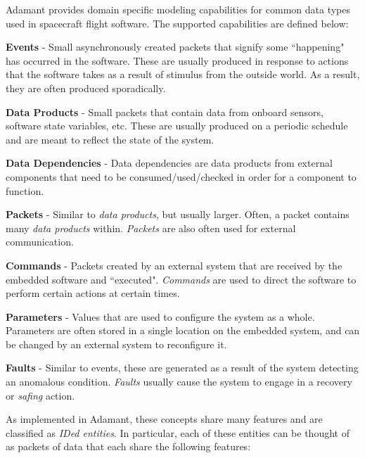 Adamant provides domain specific modeling capabilities for common data types used in spacecraft flight software. The supported capabilities are defined below:

\vspace{5mm} %
\begin{spaceditemize}
  \item \textbf{Events} - Small asynchronously created packets that signify some ``happening" has occurred in the software. These are usually produced in response to actions that the software takes as a result of stimulus from the outside world. As a result, they are often produced sporadically.
  \item \textbf{Data Products} - Small packets that contain data from onboard sensors, software state variables, etc. These are usually produced on a periodic schedule and are meant to reflect the state of the system.
  \item \textbf{Data Dependencies} - Data dependencies are data products from external components that need to be consumed/used/checked in order for a component to function.
  \item \textbf{Packets} - Similar to \textit{data products}, but usually larger. Often, a packet contains many \textit{data products} within. \textit{Packets} are also often used for external communication.
  \item \textbf{Commands} - Packets created by an external system that are received by the embedded software and ``executed". \textit{Commands} are used to direct the software to perform certain actions at certain times.
  \item \textbf{Parameters} - Values that are used to configure the system as a whole. Parameters are often stored in a single location on the embedded system, and can be changed by an external system to reconfigure it.
  \item \textbf{Faults} - Similar to events, these are generated as a result of the system detecting an anomalous condition. \textit{Faults} usually cause the system to engage in a recovery or \textit{safing} action.
\end{spaceditemize}
\vspace{5mm} %

As implemented in Adamant, these concepts share many features and are classified as \textit{IDed entities}. In particular, each of these entities can be thought of as packets of data that each share the following features: 

